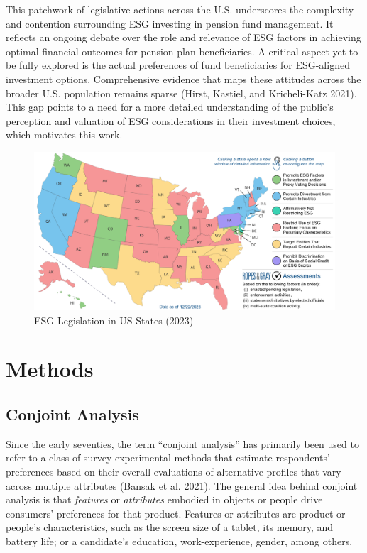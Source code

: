 \documentclass[
  12pt,
]{article}
\begin{document}
This patchwork of legislative actions across the U.S. underscores the complexity and contention surrounding ESG investing in pension fund management. It reflects an ongoing debate over the role and relevance of ESG factors in achieving optimal financial outcomes for pension plan beneficiaries. A critical aspect yet to be fully explored is the actual preferences of fund beneficiaries for ESG-aligned investment options. Comprehensive evidence that maps these attitudes across the broader U.S. population remains sparse (Hirst, Kastiel, and Kricheli-Katz 2021). This gap points to a need for a more detailed understanding of the public's perception and valuation of ESG considerations in their investment choices, which motivates this work.

\begin{figure}

{\centering \includegraphics[width=1\textwidth]{ropesandgrey} 

}

\caption{ESG Legislation in US States (2023)}\label{fig:mapplot}
\end{figure}

\hypertarget{methods}{%
\section{Methods}\label{methods}}

\hypertarget{conjoint-analysis}{%
\subsection{Conjoint Analysis}\label{conjoint-analysis}}

Since the early seventies, the term ``conjoint analysis'' has primarily been used to refer to a class of survey-experimental methods that estimate respondents' preferences based on their overall evaluations of alternative profiles that vary across multiple attributes (Bansak et al. 2021). The general idea behind conjoint analysis is that \emph{features} or \emph{attributes} embodied in objects or people drive consumers' preferences for that product. Features or attributes are product or people's characteristics, such as the screen size of a tablet, its memory, and battery life; or a candidate's education, work-experience, gender, among others.
\end{document}
